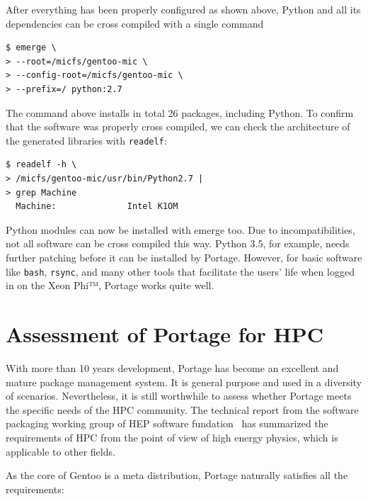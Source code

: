 \documentclass[a4paper,conference]{IEEEtran}
\begin{document}
After everything has been properly configured as shown above, Python
and all its dependencies can be cross compiled with a single command
\begin{verbatim}
$ emerge \
> --root=/micfs/gentoo-mic \
> --config-root=/micfs/gentoo-mic \
> --prefix=/ python:2.7
\end{verbatim}

The command above installs in total 26 packages, including Python.
To confirm that the software was properly cross compiled, we can check
the architecture of the generated libraries with \verb|readelf|:
\begin{verbatim}
$ readelf -h \
> /micfs/gentoo-mic/usr/bin/Python2.7 |
> grep Machine
  Machine:              Intel K1OM
\end{verbatim}

Python modules can now be installed with emerge too. Due to
incompatibilities, not all software can be cross compiled this way.
Python 3.5, for example, needs further patching before it can be
installed by Portage. However, for basic software like \verb|bash|,
\verb|rsync|, and many other tools that facilitate the users' life
when logged in on the Xeon Phi™, Portage works quite well.

\section{Assessment of Portage for HPC}

With more than 10 years development, Portage has become an excellent and
mature package management system. It is general purpose and used in a
diversity of scenarios. Nevertheless, it is still worthwhile to assess
whether Portage meets the specific needs of the HPC community. The
technical report from the software packaging working group of HEP software
fundation~\cite{hsf:package} has summarized the requirements of HPC from
the point of view of high energy physics, which is applicable to other
fields.

As the core of Gentoo is a meta distribution, Portage naturally satisfies
all the requirements:
\end{document}

